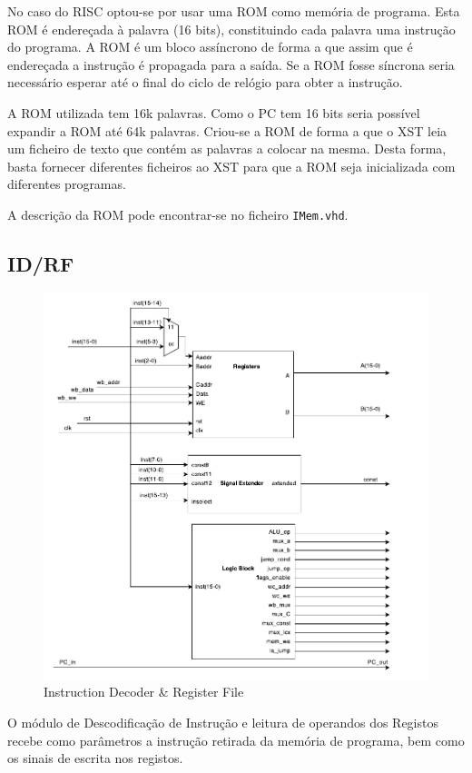 \documentclass[a4paper]{article}
\begin{document}
			No caso do \textmu RISC optou-se por usar uma ROM como memória de programa. Esta ROM é endereçada à palavra (16 bits), constituindo cada palavra uma instrução do programa. A ROM é um bloco assíncrono de forma a que assim que é endereçada a instrução é propagada para a saída. Se a ROM fosse síncrona seria necessário esperar até o final do ciclo de relógio para obter a instrução.
			
			A ROM utilizada tem 16k palavras. Como o PC tem 16 bits seria possível expandir a ROM até 64k palavras. Criou-se a ROM de forma a que o XST leia um ficheiro de texto que contém as palavras a colocar na mesma. Desta forma, basta fornecer diferentes ficheiros ao XST para que a ROM seja inicializada com diferentes programas.
			
			A descrição da ROM pode encontrar-se no ficheiro \texttt{IMem.vhd}.


		\subsection{ID/RF}
			
			\begin{figure}[H]
				\centering
				\includegraphics[width=.8\textwidth]{img/idrf}
				\caption{Instruction Decoder \& Register File}
				\label{fig:idrf}
			\end{figure}
			
			O módulo de Descodificação de Instrução e leitura de operandos dos Registos recebe como parâmetros a instrução retirada da memória de programa, bem como os sinais de escrita nos registos.
			
\end{document}
